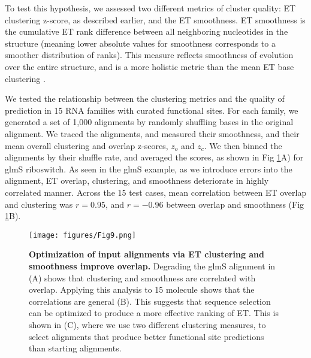 \documentclass[12pt,a4paper]{report}
\begin{document}
To test this hypothesis, we assessed two different metrics of cluster quality: ET clustering z-score, as described earlier, and the ET smoothness. ET smoothness is the cumulative ET rank difference between all neighboring nucleotides in the structure (meaning lower absolute values for smoothness corresponds to a smoother distribution of ranks). This measure reflects smoothness of evolution over the entire structure, and is a more holistic metric than the mean ET base clustering \cite{Wilkins2013}.

We tested the relationship between the clustering metrics and the quality of prediction in 15 RNA families with curated functional sites. For each family, we generated a set of 1,000 alignments by randomly shuffling bases in the original alignment. We traced the alignments, and measured their smoothness, and their mean overall clustering and overlap z-scores, $z_o$  and $z_c$. We then binned the alignments by their shuffle rate, and averaged the scores, as shown in Fig \ref{fig:et_optimization}A) for glmS riboswitch. As seen in the glmS example, as we introduce errors into the alignment, ET overlap, clustering, and smoothness deteriorate in highly correlated manner. Across the 15 test cases, mean correlation between ET overlap and clustering was $r=0.95$, and $r=-0.96$ between overlap and smoothness (Fig \ref{fig:et_optimization}B).

\begin{figure}
\begin{minipage}[c][\textheight]{\textwidth}
\centering
\vspace{-1.5in}
  \texttt{[image: figures/Fig9.png]}
  \caption[Optimization of input alignments via ET clustering and smoothness improves overlap.]{\textbf{Optimization of input alignments via ET clustering and smoothness improve overlap.} Degrading the glmS alignment in (A) shows that clustering and smoothness are correlated with overlap. Applying this analysis to 15 molecule shows that the correlations are general (B). This suggests that sequence selection can be optimized to produce a more effective ranking of ET. This is shown in (C), where we use two different clustering measures, to select alignments that produce better functional site predictions than starting alignments.}
  \label{fig:et_optimization}
  \end{minipage}
\end{figure}
\end{document}
